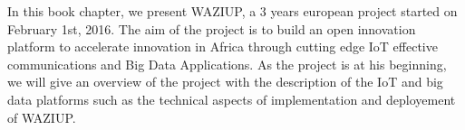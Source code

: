In this book chapter, we present WAZIUP, a 3 years european project started on February 1st, 2016. The aim of the project is to build an open innovation platform to accelerate innovation in Africa through cutting edge IoT effective communications and Big Data Applications. As the project is at his beginning, we will give an overview of the project with the description of the IoT and big data platforms such as the technical aspects of implementation and deployement of WAZIUP. 
